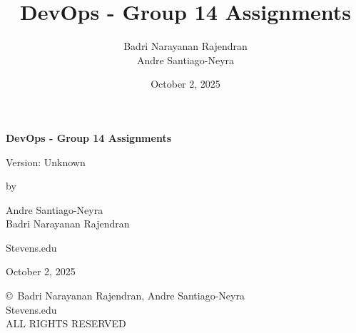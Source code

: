 \documentclass[12pt,a4paper]{report}
\title{DevOps - Group 14 Assignments}
\date{October 2, 2025}
\author{
    Badri Narayanan Rajendran \\
    Andre Santiago-Neyra 
}
\newcommand{\gitversion}{Unknown}
\begin{document}

\begin{titlepage}
    \centering
    \vspace*{5cm}
    
    {\Huge\bfseries DevOps - Group 14 Assignments\par}
    
    \vspace{1cm}
    {\large Version: \gitversion\par}
    {\Large by\par}
    
    \vspace{0.5cm}
    
    {\Large
    Andre Santiago-Neyra\\
    Badri Narayanan Rajendran\\
    }
    
    \vspace{1cm}
    
    {\large Stevens.edu\par}
    
    \vfill
    
    {\large October 2, 2025\par}
    
\end{titlepage}

\newpage
\thispagestyle{empty}
\vspace*{\fill}
\begin{center}
    \copyright\ Badri Narayanan Rajendran, Andre Santiago-Neyra\\
    Stevens.edu\\
    ALL RIGHTS RESERVED
\end{center}
\vspace*{\fill}

\clearpage


\clearpage


\tableofcontents

\listoftables

\listoffigures

\clearpage
\setcounter{page}{1}








\clearpage
\printnoidxglossaries

\clearpage



\clearpage
\printindex
\end{document}
